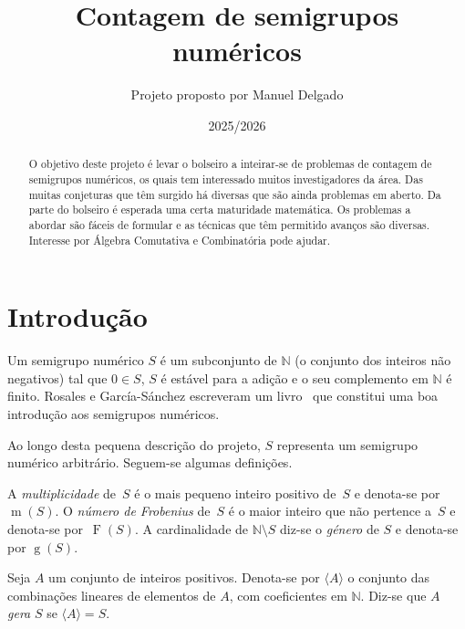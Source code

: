\documentclass[12pt,a4paper]{article}
\title{Contagem de semigrupos numéricos}
\author{Projeto proposto por Manuel Delgado}
\date{2025/2026}
\numberwithin{table}{section}
\numberwithin{figure}{section}
\numberwithin{equation}{section}
\DeclareMathOperator{\Frobeniusoper}{F} %
\DeclareMathOperator{\multiplicityoper}{m} %
\DeclareMathOperator{\genusoper}{g} %
\theoremstyle{definition}
\theoremstyle{remark}
\begin{document}
\maketitle


\begin{abstract}
  
  O objetivo deste projeto é levar o bolseiro a inteirar-se de problemas de contagem de semigrupos numéricos, os quais tem interessado muitos investigadores da área. Das muitas conjeturas que têm surgido há diversas que são ainda problemas em aberto.
%
  Da parte do bolseiro é esperada uma certa maturidade matemática. Os problemas a abordar são fáceis de formular e as técnicas que têm permitido avanços são diversas. Interesse por Álgebra Comutativa e Combinatória pode ajudar. 
 
\end{abstract}



\section{Introdução}\label{sec:introducao}

Um semigrupo numérico \(S\) é um subconjunto de \(\mathbb{N}\) (o conjunto dos inteiros não negativos) tal que \(0 \in S\), \(S\) é estável para a adição e o seu complemento em \(\mathbb{N}\) é finito.
%
Rosales e García-Sánchez escreveram um livro~\cite{RosalesGarcia2009Book-Numerical} que constitui uma boa introdução aos semigrupos numéricos. 

Ao longo desta pequena descrição do projeto, \(S\) representa um semigrupo numérico arbitrário. Seguem-se algumas definições.

A \emph{multiplicidade} de~\(S\) é o mais pequeno inteiro positivo de~\(S\) e denota-se por~\(\multiplicityoper(S)\).
O \emph{número de Frobenius} de~\(S\) é o maior inteiro que não pertence a~\(S\) e denota-se por~\(\Frobeniusoper(S)\).
A cardinalidade de \(\mathbb{N}\setminus S\) diz-se o \emph{género} de \(S\) e denota-se por \(\genusoper(S)\).

Seja \(A\) um conjunto de inteiros positivos. Denota-se por \(\langle A \rangle\) o conjunto das combinações lineares de elementos de \(A\), com coeficientes em \(\mathbb{N}\). Diz-se que \(A\) \emph{gera} \(S\) se \(\langle A \rangle = S\).
\end{document}
